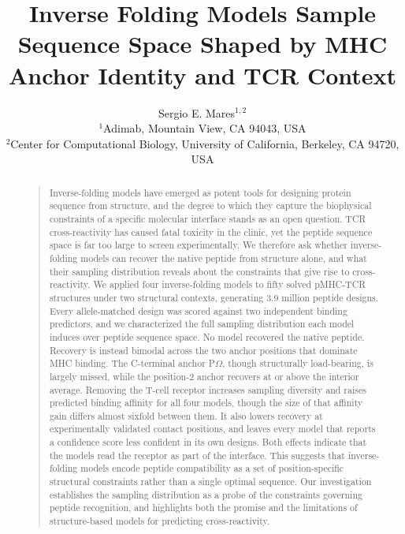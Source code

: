 \documentclass[letterpaper]{article}
\begin{document}
\title{Inverse Folding Models Sample Sequence Space Shaped by MHC Anchor Identity and TCR Context}
\author{Sergio E. Mares$^{1,2}$ \\
{\small $^1$Adimab, Mountain View, CA 94043, USA} \\
{\small $^2$Center for Computational Biology, University of California, Berkeley, CA 94720, USA}}
\nocopyright
\maketitle

\begin{abstract}
\begin{quote}
Inverse-folding models have emerged as potent tools for designing protein sequence from structure, and the degree to which they capture the biophysical constraints of a specific molecular interface stands as an open question. TCR cross-reactivity has caused fatal toxicity in the clinic, yet the peptide sequence space is far too large to screen experimentally. We therefore ask whether inverse-folding models can recover the native peptide from structure alone, and what their sampling distribution reveals about the constraints that give rise to cross-reactivity. We applied four inverse-folding models to fifty solved pMHC-TCR structures under two structural contexts, generating 3.9 million peptide designs. Every allele-matched design was scored against two independent binding predictors, and we characterized the full sampling distribution each model induces over peptide sequence space. No model recovered the native peptide. Recovery is instead bimodal across the two anchor positions that dominate MHC binding. The C-terminal anchor P$\Omega$, though structurally load-bearing, is largely missed, while the position-2 anchor recovers at or above the interior average. Removing the T-cell receptor increases sampling diversity and raises predicted binding affinity for all four models, though the size of that affinity gain differs almost sixfold between them. It also lowers recovery at experimentally validated contact positions, and leaves every model that reports a confidence score less confident in its own designs. Both effects indicate that the models read the receptor as part of the interface. This suggests that inverse-folding models encode peptide compatibility as a set of position-specific structural constraints rather than a single optimal sequence. Our investigation establishes the sampling distribution as a probe of the constraints governing peptide recognition, and highlights both the promise and the limitations of structure-based models for predicting cross-reactivity.
\end{quote}
\end{abstract}
\end{document}
